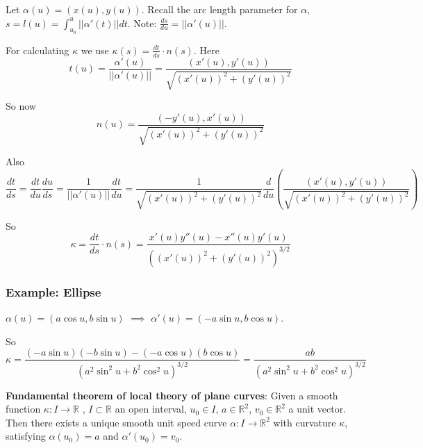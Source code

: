 Let $\alpha(u) = (x(u), y(u))$. Recall the arc length parameter for $\alpha$, $s = l(u) = \int_{u_0}^u || \alpha'(t)|| dt$. Note: $\frac{ds}{du} = || \alpha'(u)||.$

For calculating $\kappa$ we use $\kappa(s) = \frac{dt}{ds} \cdot n(s)$. Here $$t(u) = \frac{\alpha'(u)}{||\alpha'(u)||} = \frac{(x'(u), y'(u))}{\sqrt{(x'(u))^2 + (y'(u))^2}}$$

So now $$n(u) = \frac{(-y'(u), x'(u))}{\sqrt{(x'(u))^2 + (y'(u))^2}}$$

Also $$\frac{dt}{ds} = \frac{dt}{du} \frac{du}{ds} = \frac{1}{||\alpha'(u)||} \frac{dt}{du} = \frac{1}{\sqrt{(x'(u))^2 + (y'(u))^2}} \frac{d}{du} \left(\frac{(x'(u), y'(u))}{\sqrt{(x'(u))^2 + (y'(u))^2}}\right)$$

So $$\kappa = \frac{dt}{ds} \cdot n(s) = \frac{x'(u) y''(u) - x''(u) y'(u)}{((x'(u))^2 + (y'(u))^2)^{3/2}}$$

\subsubsection*{Example: Ellipse}

$\alpha (u) = (a \cos u, b \sin u)$ $\implies$ $\alpha'(u) = (- a \sin u, b \cos u)$.

So $$\kappa = \frac{(-a \sin u)(-b \sin u) - (-a \cos u)(b \cos u)}{(a^2 \sin^2 u + b^2 \cos^2 u)^{3/2}} = \frac{ab}{(a^2 \sin^2 u + b^2 \cos^2 u)^{3/2}}$$

\vspace{\baselineskip}

\textbf{Fundamental theorem of local theory of plane curves}: Given a smooth function $\kappa : I \rightarrow \mathbb{R}$ , $I \subset \mathbb{R}$ an open interval, $u_0 \in I$, $a \in \mathbb{R}^2$, $v_0 \in \mathbb{R}^2$ a unit vector. Then there exists a unique smooth unit speed curve $\alpha : I \rightarrow \mathbb{R}^2$ with curvature $\kappa$, satisfying $\alpha(u_0) = a$ and $\alpha'(u_0) = v_0$.